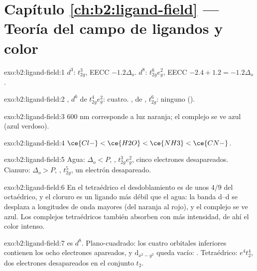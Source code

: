 \section*{Capítulo \ref{ch:b2:ligand-field} --- Teoría del campo de ligandos y color}

\begin{solution}{exo:b2:ligand-field:1}
$d^3$: $t_{2g}^3$, EECC $-1.2\Delta_o$. $d^8$: $t_{2g}^6e_g^2$, EECC $-2.4 + 1.2 = -1.2\Delta_o$.
\end{solution}

\begin{solution}{exo:b2:ligand-field:2}
, $d^6$ de  $t_{2g}^4e_g^2$: cuatro. , de ,
$t_{2g}^6$: ninguno ().
\end{solution}

\begin{solution}{exo:b2:ligand-field:3}
600 nm corresponde a luz naranja; el complejo se ve azul (azul verdoso).
\end{solution}

\begin{solution}{exo:b2:ligand-field:4}
$\ce{Cl-} < \ce{H2O} < \ce{NH3} < \ce{CN-}$.
\end{solution}

\begin{solution}{exo:b2:ligand-field:5}
Agua: $\Delta_o < P$, , $t_{2g}^3e_g^2$, cinco electrones desapareados. Cianuro: $\Delta_o > P$,
, $t_{2g}^5$, un electrón desapareado.
\end{solution}

\begin{solution}{exo:b2:ligand-field:6}
En el  tetraédrico el desdoblamiento es de unos $4/9$ del octaédrico, y
el cloruro es un ligando más débil que el agua: la banda d--d se desplaza a longitudes de onda mayores (del naranja
al rojo), y el complejo se ve azul. Los complejos tetraédricos también absorben con más intensidad,
de ahí el color intenso.
\end{solution}

\begin{solution}{exo:b2:ligand-field:7}
 es $d^8$. Plano-cuadrado: los cuatro orbitales inferiores contienen los ocho electrones apareados,
y $\mathrm d_{x^2-y^2}$ queda vacío: . Tetraédrico: $e^4t_2^4$, dos electrones desapareados
en el conjunto $t_2$.
\end{solution}


